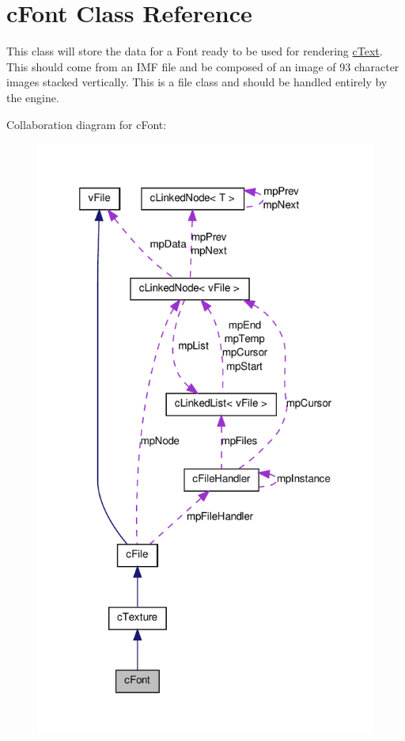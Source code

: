 \hypertarget{classc_font}{
\section{cFont Class Reference}
\label{classc_font}
}


This class will store the data for a Font ready to be used for rendering \hyperlink{classc_text}{cText}. This should come from an IMF file and be composed of an image of 93 character images stacked vertically. This is a file class and should be handled entirely by the engine.  




Collaboration diagram for cFont:\nopagebreak
\begin{figure}[H]
\begin{center}
\leavevmode
\includegraphics[width=320pt]{classc_font__coll__graph}
\end{center}
\end{figure}
